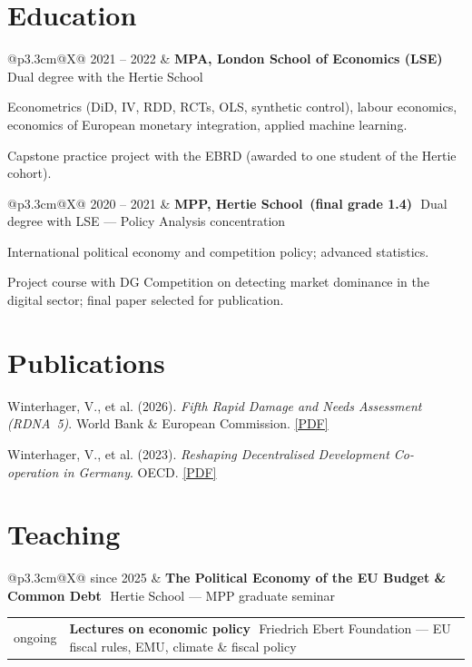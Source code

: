 \documentclass[11pt,a4paper]{article}
\makeatletter
\newcommand{\entry}[3]{%
  \noindent\begin{tabularx}{\linewidth}{@{}p{3.3cm}@{\hspace{0.5em}}X@{}}
    {\small\color{muted} #1} & {\textbf{#2}}\,\,{\small\color{muted} #3} \\
  \end{tabularx}%
}
\makeatother
\begin{document}
\section{Education}

\entry{2021 -- 2022}{MPA, London School of Economics (LSE)}{Dual degree with the Hertie School}
\begin{tasks}
  \item Econometrics (DiD, IV, RDD, RCTs, OLS, synthetic control), labour economics, economics of European monetary integration, applied machine learning.
  \item Capstone practice project with the EBRD (awarded to one student of the Hertie cohort).
\end{tasks}

\entry{2020 -- 2021}{MPP, Hertie School \,\textnormal{\small(final grade 1.4)}}{Dual degree with LSE --- Policy Analysis concentration}
\begin{tasks}
  \item International political economy and competition policy; advanced statistics.
  \item Project course with DG Competition on detecting market dominance in the digital sector; final paper selected for publication.
\end{tasks}

\section{Publications}
\begin{tasks}
  \item Winterhager, V., et al. (2026). \textit{Fifth Rapid Damage and Needs Assessment (RDNA~5)}. World Bank \& European Commission. \href{https://documents1.worldbank.org/curated/en/099022026094036395/pdf/P514499-22f93f3a-4278-42bc-b907-db9553d12069.pdf}{[PDF]}
  \item Winterhager, V., et al. (2023). \textit{Reshaping Decentralised Development Co-operation in Germany}. OECD. \href{https://www.oecd.org/content/dam/oecd/en/publications/reports/2023/04/reshaping-decentralised-development-co-operation-in-germany_2feec761/afedb776-en.pdf}{[PDF]}
\end{tasks}

\section{Teaching}
\entry{since 2025}{The Political Economy of the EU Budget \& Common Debt}{Hertie School --- MPP graduate seminar}
\entry{ongoing}{Lectures on economic policy}{Friedrich Ebert Foundation --- EU fiscal rules, EMU, climate \& fiscal policy}
\end{document}
